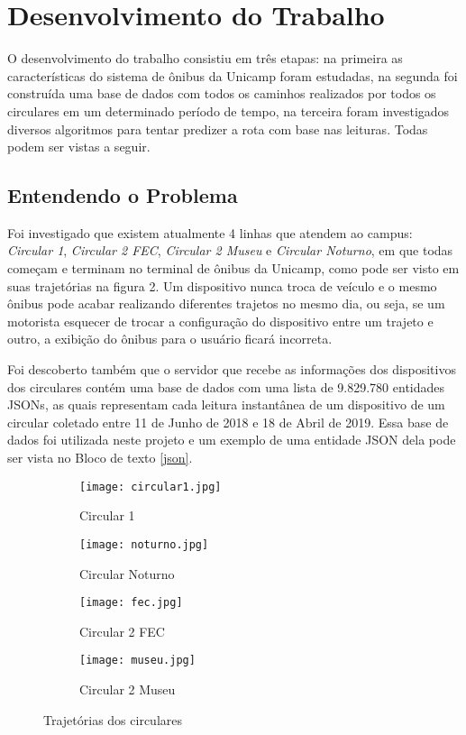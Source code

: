 \documentclass[11pt,twoside]{article}
\begin{document}
\section{Desenvolvimento do Trabalho}

O desenvolvimento do trabalho consistiu em três etapas: na primeira as características do sistema de ônibus da Unicamp foram estudadas, na segunda foi construída uma base de dados com todos os caminhos realizados por todos os circulares em um determinado período de tempo, na terceira foram investigados diversos algoritmos para tentar predizer a rota com base nas leituras. Todas podem ser vistas a seguir.

\subsection{Entendendo o Problema}

Foi investigado que existem atualmente 4 linhas que atendem ao campus: \emph{Circular 1}, \emph{Circular 2 FEC}, \emph{Circular 2 Museu} e \emph{Circular Noturno}, em que todas começam e terminam no terminal de ônibus da Unicamp, como pode ser visto em suas trajetórias na figura 2. Um dispositivo nunca troca de veículo e o mesmo ônibus pode acabar realizando diferentes trajetos no mesmo dia, ou seja, se um motorista esquecer de trocar a configuração do dispositivo entre um trajeto e outro, a exibição do ônibus para o usuário ficará incorreta.

Foi descoberto também que o servidor que recebe as informações dos dispositivos dos circulares contém uma base de dados com uma lista de 9.829.780 entidades JSONs, as quais representam cada leitura instantânea de um dispositivo de um circular coletado entre 11 de Junho de 2018 e 18 de Abril de 2019. Essa base de dados foi utilizada neste projeto e um exemplo de uma entidade JSON dela pode ser vista no Bloco de texto \ref{json}.

\begin{figure}
    \centering
    \label{fig:circulares}
    \begin{subfigure}{6cm}
        \centering\texttt{[image: circular1.jpg]}
        \label{circular1}
        \caption{Circular 1}
    \end{subfigure}
    \begin{subfigure}{6cm}
        \centering\texttt{[image: noturno.jpg]}
        \label{noturno}
        \caption{Circular Noturno}
    \end{subfigure}
    \begin{subfigure}{6cm}
        \centering\texttt{[image: fec.jpg]}
        \label{fec}
        \caption{Circular 2 FEC}
    \end{subfigure}
    \begin{subfigure}{6cm}
        \centering\texttt{[image: museu.jpg]}
        \label{museu}
        \caption{Circular 2 Museu}
    \end{subfigure}
    \caption{Trajetórias dos circulares}
\end{figure}
\end{document}
